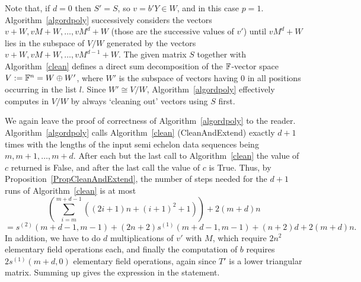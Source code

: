 \begin{Rem}
Note that, if $d=0$ then $S'=S$, so $v=b'Y\in W$, and in this case $p=1$. 
Algorithm~\ref{algordpoly} successively considers the vectors $v+W,
vM+W, \ldots, vM^d+W$  (those are the successive values of
$v'$) until $vM^d+W$ lies in the subspace of $V/W$ 
generated by the vectors $v+W, vM+W, \ldots, vM^{d-1}+W$. 
The given matrix $S$ together with Algorithm~\ref{clean} defines a
direct sum decomposition of the $\mathbb{F}$-vector space $V := \mathbb{F}^n = W \oplus
W'$,
where $W'$ is the subspace of vectors having $0$ in all positions
occurring in the list $l$. Since $W' \cong V/W$, 
Algorithm~\ref{algordpoly} effectively computes in $V/W$ by always `cleaning
out' vectors using $S$ first. 
\end{Rem}

We again leave the proof of correctness of Algorithm~\ref{algordpoly}
to the reader.
Algorithm~\ref{algordpoly} calls Algorithm~\ref{clean} ({\sc CleanAnd\-Extend}) exactly
$d+1$ times with the lengths of the input semi echelon data
sequences being $m,m+1, \ldots, m+d$. After each but the last call to
Algorithm~\ref{clean} the value of 
$c$ returned is {\sc False}, and after the last call the value of $c$ 
is {\sc True}. Thus, by
Proposition~\ref{PropCleanAndExtend}, the number of steps needed 
for the $d+1$ runs of Algorithm~\ref{clean} is at most
\[
\left(\sum_{i=m}^{m+d-1} ((2i+1)n+(i+1)^2+1)\right)  +  2(m+d)n  \]
\[
   = s^{(2)}(m+d-1,m-1) + (2n+2)s^{(1)}(m+d-1,m-1) + (n+2)d +2(m+d)n.
\]
\enlargethispage{1\baselineskip}%
In addition, we have to do $d$ multiplications of $v'$ with $M$, which require
$2n^2$ elementary field operations each, and finally the computation of $b$
requires $2s^{(1)}(m+d,0)$ elementary field operations, again since 
$T'$ is a lower triangular matrix. Summing up gives the expression in 
the statement. 
\proofend

